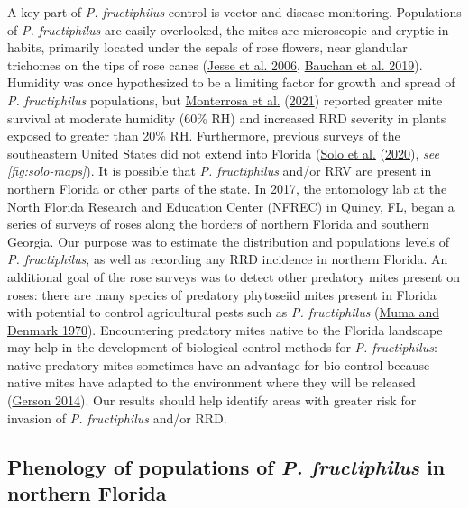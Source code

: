 \documentclass[12pt,final,CPage]{ufthesis}
\begin{document}
{  A key part of \emph{P. fructiphilus} control is vector and disease monitoring. Populations of \emph{P. fructiphilus} are easily overlooked, the mites are microscopic and cryptic in habits, primarily located under the sepals of rose flowers, near glandular trichomes on the tips of rose canes (\protect\hyperlink{ref-Jesse2006}{Jesse et al. 2006}, \protect\hyperlink{ref-Bauchan2019}{Bauchan et al. 2019}). Humidity was once hypothesized to be a limiting factor for growth and spread of \emph{P. fructiphilus} populations, but \protect\hyperlink{ref-Monterrosa2021}{Monterrosa et al.} (\protect\hyperlink{ref-Monterrosa2021}{2021}) reported greater mite survival at moderate humidity (60\% RH) and increased RRD severity in plants exposed to greater than 20\% RH. Furthermore, previous surveys of the southeastern United States did not extend into Florida (\protect\hyperlink{ref-Solo2020}{Solo et al.} (\protect\hyperlink{ref-Solo2020}{2020}), \emph{see \ref{fig:solo-maps}}). It is possible that \emph{P. fructiphilus} and/or RRV are present in northern Florida or other parts of the state. In 2017, the entomology lab at the North Florida Research and Education Center (NFREC) in Quincy, FL, began a series of surveys of roses along the borders of northern Florida and southern Georgia. Our purpose was to estimate the distribution and populations levels of \emph{P. fructiphilus}, as well as recording any RRD incidence in northern Florida. An additional goal of the rose surveys was to detect other predatory mites present on roses: there are many species of predatory phytoseiid mites present in Florida with potential to control agricultural pests such as \emph{P. fructiphilus} (\protect\hyperlink{ref-Muma1970}{Muma and Denmark 1970}). Encountering predatory mites native to the Florida landscape may help in the development of biological control methods for \emph{P. fructiphilus}: native predatory mites sometimes have an advantage for bio-control because native mites have adapted to the environment where they will be released (\protect\hyperlink{ref-Gerson2014}{Gerson 2014}). Our results should help identify areas with greater risk for invasion of \emph{P. fructiphilus} and/or RRD.

  \hypertarget{intro-pheno}{%
  \subsection{\texorpdfstring{Phenology of populations of \emph{P. fructiphilus} in northern Florida}{Phenology of populations of P. fructiphilus in northern Florida}}\label{intro-pheno}}

}
\end{document}
